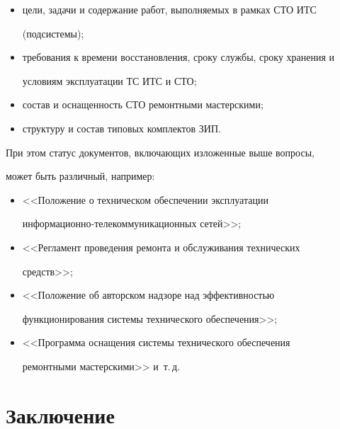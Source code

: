   \begin{itemize}


  \item цели, задачи и содержание работ, выполняемых в рамках СТО ИТС 


(под\-сис\-темы);


  \item требования к времени восстановления, сроку службы, сроку хранения и 


условиям эксплуатации ТС ИТС и СТО;


  \item состав и оснащенность СТО ремонтными мастерскими; 


  \item структуру и состав типовых комплектов ЗИП.


  \end{itemize}


  


  При этом статус документов, включающих изложенные выше вопросы, 


может быть различный, например: 


  \begin{itemize}


  \item  <<Положение о техническом обеспечении эксплуатации 


информационно-те\-ле\-ком\-муникационных сетей>>;


  \item  <<Регламент проведения ремонта и обслуживания технических 


средств>>; 


  \item  <<Положение об авторском надзоре над эффективностью 


функционирования системы технического обеспечения>>;


  \item  <<Программа оснащения системы технического обеспечения 


ремонтными мас\-тер\-скими>> и~т.\,д.


  \end{itemize}


  


\section{Заключение}





